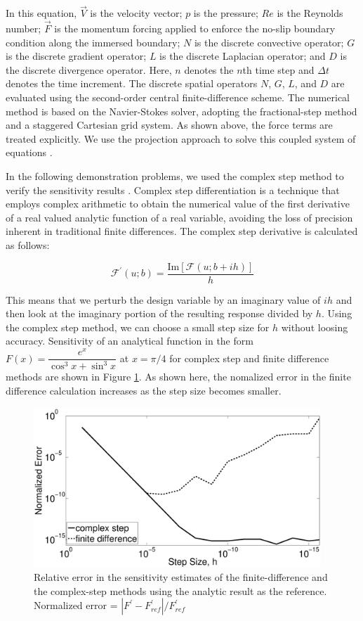 \documentclass[12pt]{aiaa-pretty}
\begin{document}
In this equation, $\vec{V}$ is the velocity vector; $p$ is the pressure; $Re$ is the Reynolds number; $\vec{F}$ is the momentum forcing applied to enforce the no-slip boundary condition along the immersed boundary; $N$ is the discrete convective operator; $G$ is the discrete gradient operator; $L$ is the discrete Laplacian operator; and $D$ is the discrete divergence operator. Here, $n$ denotes the $n$th time step and $\Delta t$ denotes the time increment. The discrete spatial operators $N$, $G$, $L$, and $D$ are evaluated using the second-order central finite-difference scheme. The numerical method is based on the Navier-Stokes solver, adopting the fractional-step method and a staggered Cartesian grid system. As shown above, the force terms are treated explicitly. We use the projection approach to solve this coupled system of equations \cite{brown2001accurate}.

In the following demonstration problems, we used the complex step method to verify the sensitivity results \cite{martins2003complex}. Complex step differentiation is a technique that employs complex arithmetic to obtain the numerical value of the first derivative of a real valued analytic function of a real variable, avoiding the loss of precision inherent in traditional finite differences. The complex step derivative is calculated as follows:

%
\begin{equation}\label{eq:compelxStepFormula}
	\mathcal{F}^\prime\left(u; b\right) = \frac{\text{Im}\left[ \mathcal{F}\left(u; b + ih\right) \right]}{h}
\end{equation}
%

This means that we perturb the design variable by an imaginary value of $ih$ and then look at the imaginary portion of the resulting response divided by $h$. Using the complex step method, we can choose a small step size for $h$ without loosing accuracy. Sensitivity of an analytical function in the form $F(x) = \dfrac{e^x}{\cos^3 x + \sin^3 x}$ at $x = \pi/4$ for complex step and finite difference methods are shown in Figure \ref{fig:CSvsFD}. As shown here, the nomalized error in the finite difference calculation increases as the step size becomes smaller.

%
\begin{figure}[H]
	\centering
	\includegraphics[height=6.0cm]{figure/FDvsCS.eps}
	\caption{Relative error in the sensitivity estimates of the finite-difference and the complex-step methods using the analytic result as the reference. Normalized error = $\left| F^\prime - F^\prime_{ref} \right| / F^\prime_{ref}$}
	\label{fig:CSvsFD}
\end{figure}
%
\end{document}
